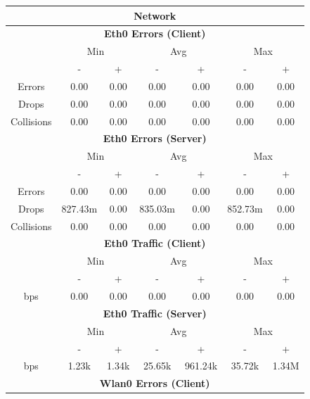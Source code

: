 \documentclass[11pt,a4paper,headinclude=false,footinclude=false]{scrreprt}
\begin{document}
\begin{table}[H]
\centering
    \begin{tabular}{||c|c|c|c|c|c|c||}
    \hline
    \multicolumn{7}{|c|}{\textbf{Network}} \\
    \hline
    \multicolumn{7}{|c|}{\textbf{Eth0 Errors (Client)}} \\
    \hline\hline
      & \multicolumn{2}{|c|}{Min} & \multicolumn{2}{|c|}{Avg} & \multicolumn{2}{|c|}{Max} \\
    \hline
     & - & + & - & + & - & + \\
    \hline
    Errors & 0.00 & 0.00 & 0.00 & 0.00 & 0.00 & 0.00 \\
    \hline
    Drops & 0.00 & 0.00 & 0.00 & 0.00 & 0.00 & 0.00 \\
    \hline
    Collisions & 0.00 & 0.00 & 0.00 & 0.00 & 0.00 & 0.00 \\
    \hline\hline
    \multicolumn{7}{|c|}{\textbf{Eth0 Errors (Server)}} \\
    \hline\hline
      & \multicolumn{2}{|c|}{Min} & \multicolumn{2}{|c|}{Avg} & \multicolumn{2}{|c|}{Max} \\
    \hline
     & - & + & - & + & - & + \\
    \hline
    Errors & 0.00 & 0.00 & 0.00 & 0.00 & 0.00 & 0.00 \\
    \hline
    Drops & 827.43m & 0.00 & 835.03m & 0.00 & 852.73m & 0.00 \\
    \hline
    Collisions & 0.00 & 0.00 & 0.00 & 0.00 & 0.00 & 0.00 \\
    \hline\hline
    \multicolumn{7}{|c|}{\textbf{Eth0 Traffic (Client)}} \\
    \hline\hline
      & \multicolumn{2}{|c|}{Min} & \multicolumn{2}{|c|}{Avg} & \multicolumn{2}{|c|}{Max} \\
    \hline
      & - & + & - & + & - & + \\
    \hline
    bps & 0.00 & 0.00 & 0.00 & 0.00 & 0.00 & 0.00 \\
    \hline\hline
    \multicolumn{7}{|c|}{\textbf{Eth0 Traffic (Server)}} \\
    \hline\hline
      & \multicolumn{2}{|c|}{Min} & \multicolumn{2}{|c|}{Avg} & \multicolumn{2}{|c|}{Max} \\
    \hline
      & - & + & - & + & - & + \\
    \hline
    bps & 1.23k & 1.34k & 25.65k & 961.24k & 35.72k & 1.34M \\
    \hline\hline
    \multicolumn{7}{|c|}{\textbf{Wlan0 Errors (Client)}} \\

\end{tabular}
\end{table}
\end{document}
